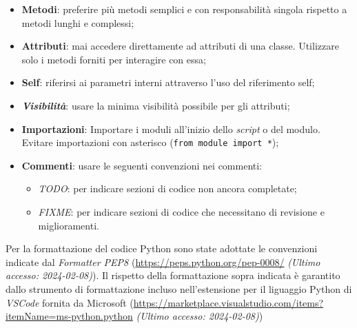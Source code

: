 \documentclass[10pt, a4paper]{article}
\begin{document}
\begin{itemize}
    \item \textbf{Metodi}: preferire più metodi semplici e con responsabilità singola rispetto a metodi lunghi e complessi;
    \item \textbf{Attributi}: mai accedere direttamente ad attributi di una classe. Utilizzare solo i metodi forniti per interagire con essa;
    \item \textbf{Self}: riferirsi ai parametri interni attraverso l'uso del riferimento self;
    \item \textbf{\textit{Visibilità\pg}}: usare la minima visibilità possibile per gli attributi;
    \item \textbf{Importazioni}: Importare i moduli all'inizio dello \textit{script\pg} o del modulo. Evitare importazioni con asterisco (\texttt{from module import *});
    \item \textbf{Commenti}: usare le seguenti convenzioni nei commenti:
        \begin{itemize}
            \item \textit{TODO\pg}: per indicare sezioni di codice non ancora completate;
            \item \textit{FIXME\pg}: per indicare sezioni di codice che necessitano di revisione e miglioramenti.
        \end{itemize}
\end{itemize}
Per la formattazione del codice Python sono state adottate le convenzioni indicate dal \textit{Formatter PEP8\pg} (\url{https://peps.python.org/pep-0008/} \textit{(Ultimo accesso: 2024-02-08)}).
Il rispetto della formattazione sopra indicata è garantito dallo strumento di formattazione incluso nell'estensione per il liguaggio Python di \textit{VSCode\pg} fornita da Microsoft (\url{https://marketplace.visualstudio.com/items?itemName=ms-python.python} \textit{(Ultimo accesso: 2024-02-08)})
\end{document}
